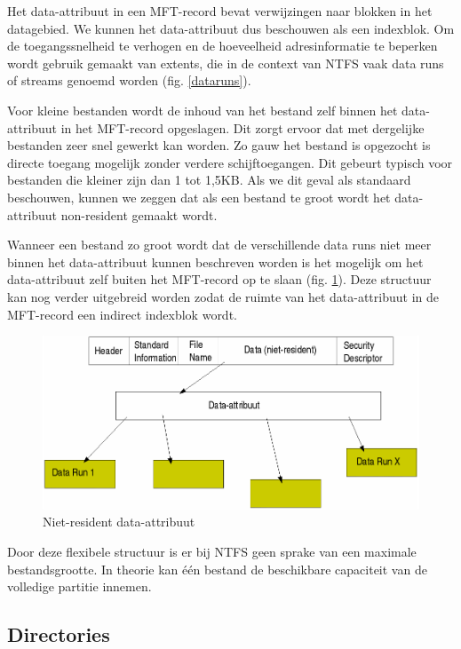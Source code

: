 Het data-attribuut in een MFT-record bevat verwijzingen naar
blokken in het datagebied. We kunnen het data-attribuut dus beschouwen
als een indexblok. Om de toegangssnelheid te verhogen en de
hoeveelheid adresinformatie te beperken wordt gebruik gemaakt van
extents, die in de context van NTFS vaak data runs of streams genoemd
worden (fig. \ref{dataruns}).

Voor kleine bestanden wordt de inhoud van het bestand zelf
binnen het data-attribuut in het MFT-record opgeslagen. Dit zorgt
ervoor dat met dergelijke bestanden zeer snel gewerkt kan worden. Zo
gauw het bestand is opgezocht is directe toegang mogelijk zonder
verdere schijftoegangen. Dit gebeurt typisch voor bestanden die
kleiner zijn dan 1 tot 1,5KB. Als we dit geval als standaard
beschouwen, kunnen we zeggen dat als een bestand te groot wordt het
data-attribuut non-resident gemaakt wordt.

Wanneer een bestand zo groot wordt dat de verschillende data
runs niet meer binnen het data-attribuut kunnen beschreven worden is
het mogelijk om het data-attribuut zelf buiten het MFT-record op te
slaan (fig. \ref{nonresdata}). Deze structuur kan nog verder uitgebreid worden zodat de ruimte
van het data-attribuut in de MFT-record een indirect indexblok
wordt.

\begin{figure}
\begin{center}
\includegraphics[width=120mm]{images/fig0418.png}
\caption{Niet-resident data-attribuut}
\label{nonresdata}
\end{center}
\end{figure}

Door deze flexibele structuur is er bij NTFS geen sprake van een
maximale bestandsgrootte. In theorie kan \'e\'en bestand de beschikbare
capaciteit van de volledige partitie innemen.

\subsection{Directories}

